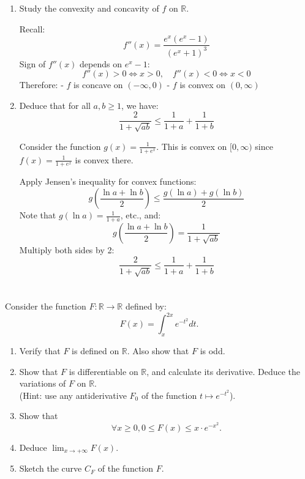 \documentclass[12pt]{article}
\begin{document}
\begin{answerbox}
\begin{enumerate}
    \item Study the convexity and concavity of $ f $ on $ \mathbb{R} $.

    Recall:
    $$
    f''(x) = \frac{e^x(e^x - 1)}{(e^x + 1)^3}
    $$
    Sign of $ f''(x) $ depends on $ e^x - 1 $:
    $$
    f''(x) > 0 \iff x > 0,\quad f''(x) < 0 \iff x < 0
    $$
    Therefore:
    - $ f $ is concave on $ (-\infty, 0) $
    - $ f $ is convex on $ (0, \infty) $

    \item Deduce that for all $ a, b \geq 1 $, we have:
    $$
    \frac{2}{1 + \sqrt{ab}} \leq \frac{1}{1 + a} + \frac{1}{1 + b}
    $$

    Consider the function $ g(x) = \frac{1}{1 + e^x} $. This is convex on $ [0, \infty) $ since $ f(x) = \frac{1}{1 + e^x} $ is convex there.

    Apply Jensen's inequality for convex functions:
    $$
    g\left(\frac{\ln a + \ln b}{2}\right) \leq \frac{g(\ln a) + g(\ln b)}{2}
    $$
    Note that $ g(\ln a) = \frac{1}{1 + a} $, etc., and:
    $$
    g\left(\frac{\ln a + \ln b}{2}\right) = \frac{1}{1 + \sqrt{ab}}
    $$
    Multiply both sides by 2:
    $$
    \frac{2}{1 + \sqrt{ab}} \leq \frac{1}{1 + a} + \frac{1}{1 + b}
    $$
\end{enumerate}
\end{answerbox}

\newpage

\section{}
Consider the function $F: \mathbb{R} \rightarrow \mathbb{R}$ defined by:
$$F(x) = \int_{x}^{2x} e^{-t^2} dt.$$

\begin{enumerate}
\item Verify that $F$ is defined on $\mathbb{R}$. Also show that $F$ is odd.
\item Show that $F$ is differentiable on $\mathbb{R}$, and calculate its derivative. Deduce the variations of $F$ on $\mathbb{R}$.\\
(Hint: use any antiderivative $F_0$ of the function $t \mapsto e^{-t^2}$).
\item Show that
$$\forall x \geq 0, 0 \leq F(x) \leq x \cdot e^{-x^2}.$$
\item Deduce $\lim_{x \to +\infty} F(x)$.
\item Sketch the curve $C_F$ of the function $F$.
\end{enumerate}
\end{document}
